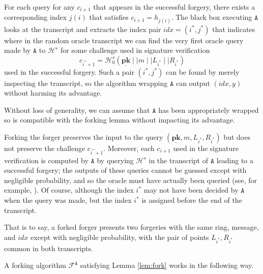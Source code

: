 \documentclass[draft]{llncs} %
\begin{document}
For each query for any $c_{i+1}$ that appears in the successful forgery, there exists a corresponding index $j(i)$ that satisfies $c_{i+1} = h_{j(i)}$. The black box executing $\texttt{A}$ looks at the transcript and extracts the index pair $\textit{idx} = (i^*, j^*)$ that indicates where in the random oracle transcript we can find the very first oracle query made by $\texttt{A}$ to $\mathcal{H}^s$ for some challenge used in signature verification \[c_{i^*+1} = \mathcal{H}^s_0\left(\underline{\textbf{pk}} \mid \mid m \mid \mid L_{i^*} \mid \mid R_{i^*}\right)\] used in the successful forgery. Such a pair $(i^*, j^*)$ can be found by merely inspecting the transcript, so the algorithm wrapping $\texttt{A}$ can output $(\textit{idx}, y)$ without harming its advantage.

Without loss of generality, we can assume that $\texttt{A}$ has been appropriately wrapped so is compatible with the forking lemma without impacting its advantage.

Forking the forger preserves the input to the query $(\underline{\textbf{pk}}, m, L_{i^*}, R_{i^*})$ but does not preserve the challenge $c_{i^*+1}$. Moreover, each $c_{i+1}$ used in the signature verification is computed by $\texttt{A}$ by querying $\mathcal{H}^s$  in the transcript of $\texttt{A}$ leading to a successful forgery; the outputs of these queries cannot be guessed except with negligible probability, and so the oracle must have actually been queried  (see, for example, \cite{liu}). Of course, although the index $i^*$ may not have been decided by $\texttt{A}$ when the query was made, but the index $i^*$ is assigned before the end of the transcript.

That is to say, a forked forger presents two forgeries with the same ring, message, and $\textit{idx}$ except with negligible probability, with the pair of points $L_{i^*}, R_{i^*}$ common in both transcripts.

A forking algorithm $\mathcal{F}^\texttt{A}$ satisfying Lemma \ref{lem:fork} works in the following way.
\end{document}
